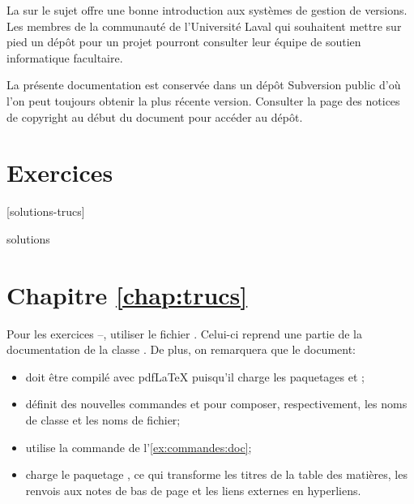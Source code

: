 La %
sur le sujet offre une bonne introduction aux systèmes de gestion de
versions. Les membres de la communauté de l'Université Laval qui
souhaitent mettre sur pied un dépôt pour un projet pourront
consulter leur équipe de soutien informatique facultaire.

\begin{information}
  La présente documentation est conservée dans un dépôt Subversion
  public d'où l'on peut toujours obtenir la plus récente version.
  Consulter la page des notices de copyright au début du document pour
  accéder au dépôt.
\end{information}




\section{Exercices}
\label{sec:trucs:exercices}

[solutions-trucs]

\begin{Filesave}{solutions}
\section*{Chapitre \ref*{chap:trucs}}

\end{Filesave}

\noindent%
Pour les exercices
\nolink{\ref{exercice:trucs:1}}--\nolink{\ref{exercice:trucs:n}},
utiliser le fichier . Celui-ci reprend
une partie de la documentation de la classe . De plus,
on remarquera que le document:
\begin{itemize}
\item doit être compilé avec pdf{\LaTeX} puisqu'il charge les
  paquetages  et ;
\item définit des nouvelles commandes \cmdprint{\class} et
  \cmdprint{\fichier} pour composer, respectivement, les noms de
  classe et les noms de fichier;
\item utilise la commande \cmdprint{\doc} de
  l'\autoref{ex:commandes:doc};
\item charge le paquetage , ce qui transforme les titres
  de la table des matières, les renvois aux notes de bas de page et
  les liens externes en hyperliens.
\end{itemize}
\medskip


